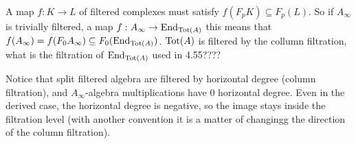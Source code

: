 \documentclass[twoside]{article}
\begin{document}
A map $f:K\to L$ of filtered complexes must satisfy $f(F_pK)\subseteq F_p(L)$. So if $A_\infty$ is trivially filtered, a map $f:A_\infty\to\operatorname{End}_{\mathrm{Tot}(A)}$ this means that $f(A_\infty)=f(F_0A_\infty)\subseteq F_0(\operatorname{End}_{\mathrm{Tot}(A)})$. $\mathrm{Tot}(A)$ is filtered by the collumn filtration, what is the filtration of $\operatorname{End}_{\mathrm{Tot}(A)}$ used in 4.55????



Notice that split filtered algebra are filtered by horizontal degree (column filtration), and $A_\infty$-algebra multiplications have $0$ horizontal degree. Even in the derived case, the horizontal degree is negative, so the image stays inside the filtration level (with another convention it is a matter of changingg the direction of the column filtration).   
\end{document}
